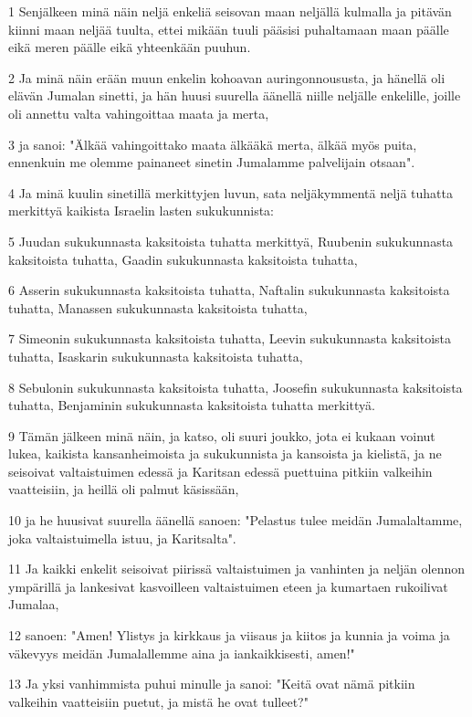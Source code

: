 \par 1 Senjälkeen minä näin neljä enkeliä seisovan maan neljällä kulmalla ja pitävän kiinni maan neljää tuulta, ettei mikään tuuli pääsisi puhaltamaan maan päälle eikä meren päälle eikä yhteenkään puuhun.
\par 2 Ja minä näin erään muun enkelin kohoavan auringonnoususta, ja hänellä oli elävän Jumalan sinetti, ja hän huusi suurella äänellä niille neljälle enkelille, joille oli annettu valta vahingoittaa maata ja merta,
\par 3 ja sanoi: "Älkää vahingoittako maata älkääkä merta, älkää myös puita, ennenkuin me olemme painaneet sinetin Jumalamme palvelijain otsaan".
\par 4 Ja minä kuulin sinetillä merkittyjen luvun, sata neljäkymmentä neljä tuhatta merkittyä kaikista Israelin lasten sukukunnista:
\par 5 Juudan sukukunnasta kaksitoista tuhatta merkittyä, Ruubenin sukukunnasta kaksitoista tuhatta, Gaadin sukukunnasta kaksitoista tuhatta,
\par 6 Asserin sukukunnasta kaksitoista tuhatta, Naftalin sukukunnasta kaksitoista tuhatta, Manassen sukukunnasta kaksitoista tuhatta,
\par 7 Simeonin sukukunnasta kaksitoista tuhatta, Leevin sukukunnasta kaksitoista tuhatta, Isaskarin sukukunnasta kaksitoista tuhatta,
\par 8 Sebulonin sukukunnasta kaksitoista tuhatta, Joosefin sukukunnasta kaksitoista tuhatta, Benjaminin sukukunnasta kaksitoista tuhatta merkittyä.
\par 9 Tämän jälkeen minä näin, ja katso, oli suuri joukko, jota ei kukaan voinut lukea, kaikista kansanheimoista ja sukukunnista ja kansoista ja kielistä, ja ne seisoivat valtaistuimen edessä ja Karitsan edessä puettuina pitkiin valkeihin vaatteisiin, ja heillä oli palmut käsissään,
\par 10 ja he huusivat suurella äänellä sanoen: "Pelastus tulee meidän Jumalaltamme, joka valtaistuimella istuu, ja Karitsalta".
\par 11 Ja kaikki enkelit seisoivat piirissä valtaistuimen ja vanhinten ja neljän olennon ympärillä ja lankesivat kasvoilleen valtaistuimen eteen ja kumartaen rukoilivat Jumalaa,
\par 12 sanoen: "Amen! Ylistys ja kirkkaus ja viisaus ja kiitos ja kunnia ja voima ja väkevyys meidän Jumalallemme aina ja iankaikkisesti, amen!"
\par 13 Ja yksi vanhimmista puhui minulle ja sanoi: "Keitä ovat nämä pitkiin valkeihin vaatteisiin puetut, ja mistä he ovat tulleet?"
